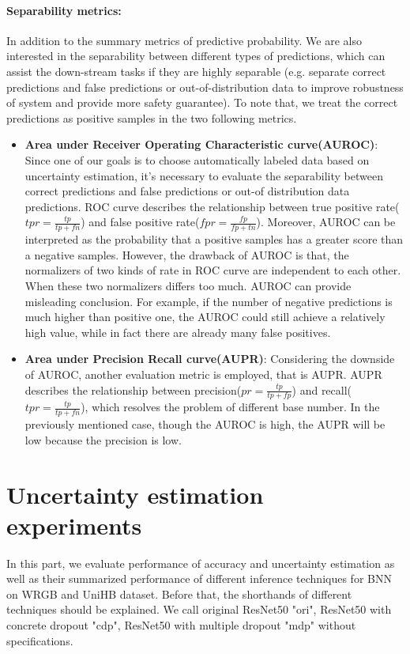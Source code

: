 \paragraph{Separability metrics:} In addition to the summary metrics of predictive probability. We are also interested in the separability between different types of predictions, which can assist the down-stream tasks if they are highly separable (e.g. separate correct predictions and false predictions or out-of-distribution data to improve robustness of system and provide more safety guarantee). To note that, we treat the correct predictions as positive samples in the two following metrics.
\begin{itemize}
	\item \textbf{Area under Receiver Operating Characteristic curve(AUROC)}: Since one of our goals is to choose automatically labeled data based on uncertainty estimation, it's necessary to evaluate the separability between correct predictions and false predictions or out-of distribution data predictions. ROC curve describes the relationship between true positive rate($tpr=\frac{tp}{tp+fn}$) and false positive rate($fpr=\frac{fp}{fp+tn}$). Moreover, AUROC can be interpreted as the probability that a positive samples has a greater score than a negative samples. However, the drawback of AUROC is that, the normalizers of two kinds of rate in ROC curve are independent to each other. When these two normalizers differs too much. AUROC can provide misleading conclusion. For example, if the number of negative predictions is much higher than positive one, the AUROC could still achieve a relatively high value, while in fact there are already many false positives. 
	
	\item \textbf{Area under Precision Recall curve(AUPR)}: Considering the downside of AUROC, another evaluation metric is employed, that is AUPR. AUPR describes the relationship between precision($pr = \frac{tp}{tp+fp}$) and recall($tpr=\frac{tp}{tp+fn}$), which resolves the problem of different base number. In the previously mentioned case, though the AUROC is high, the AUPR will be low because the precision is low. 
\end{itemize}


\section{Uncertainty estimation experiments}
In this part, we evaluate performance of accuracy and uncertainty estimation as well as their summarized performance of different inference techniques for BNN on WRGB and UniHB dataset. Before that, the shorthands of different techniques should be explained. We call original ResNet50 "ori", ResNet50 with concrete dropout "cdp", ResNet50 with multiple dropout "mdp" without specifications.


